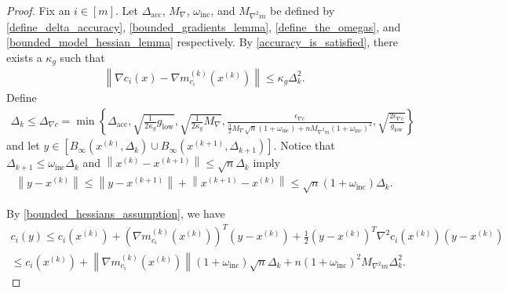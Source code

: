 \documentclass{article}
\theoremstyle{case}
\numberwithin{theorem}{subsection}
\newcommand{\dacc}{{\Delta_{\textrm{acc}}}}
\newcommand{\dk}{\Delta_k}
\newcommand{\dkpo}{\Delta_{k+1}}
\newcommand{\gmcik}{{\nabla m_{c_i}^{(k)}\left(\xk\right)}}
\newcommand{\maxgrad}{{M_{\nabla}}}
\newcommand{\maxmodelhessian}{{M_{\nabla^2 m}}}
\newcommand{\mingraddelta}{{\Delta_{\nabla c}}}
\newcommand{\mingradepsilon}{{\epsilon_{\nabla c}}}
\newcommand{\mingrad}{{ g_{\textrm{low}} }}
\newcommand{\omegainc}{\omega_{\text{inc}}}
\newcommand{\tr}{{ B_{\infty}\left(\xk, \dk\right) }}
\newcommand{\trkpo}{{ B_{\infty}\left(\xkpo, \dkpo\right) }}
\newcommand{\xkpo}{{{x}^{(k+1)}}}
\newcommand{\xk}{x^{(k)}}
\begin{document}
\begin{proof}
Fix an $i \in [m]$.
Let
$\dacc$,
$\maxgrad$,
$\omegainc$, 
and $\maxmodelhessian$
be defined by
\cref{define_delta_accuracy},
\cref{bounded_gradients_lemma},
\cref{define_the_omegas},
and \cref{bounded_model_hessian_lemma}
respectively.
By \cref{accuracy_is_satisfied}, there exists a $\kappa_g$ such that
\begin{align}
\label{oszm_accuracy}
\left\|\nabla c_i(x) - \gmcik\right\| \le \kappa_g \dk^2.
\end{align}
Define
\begin{align}
\dk \le \mingraddelta = \min\left\{
\dacc,
\sqrt{\frac 1 {2\kappa_g} \mingrad},
\sqrt{\frac 1 {2\kappa_g} \maxgrad},
\frac{\mingradepsilon}{\frac 3 2 \maxgrad\sqrt{n}\left(1 + \omegainc\right) + n \maxmodelhessian \left(1 + \omegainc\right)^2},
\sqrt{\frac{2\mingradepsilon}{\mingrad}}
\right\} \label{define_mingraddelta}
\end{align}
and let $y\in \left[\tr \cup \trkpo\right]$.
Notice that $\dkpo \le \omegainc \dk$ and $\left\|\xk - \xkpo\right\| \le \sqrt{n}\dk$ imply
\begin{align*}
\left\|y - \xk\right\| \le \left\|y - \xkpo\right\| + \left\|\xkpo - \xk\right\| \le \sqrt{n}\left(1 + \omegainc\right)\dk.
\end{align*}

By \cref{bounded_hessians_assumption}, we have
\begin{align}
c_i(y) \le c_i(\xk) + \left(\gmcik\right)^T(y - \xk) + \frac 1 2 \left(y - \xk\right)^T\nabla^2{c_i}(\xk)\left(y - \xk\right) \nonumber \\
\le c_i(\xk) + \left\|\gmcik\right\|\left(1 + \omegainc\right) \sqrt{n}\dk +n \left(1 + \omegainc\right)^2\maxmodelhessian\dk^2.
\label{oszm_first_bound}
\end{align}


\end{proof}
\end{document}
